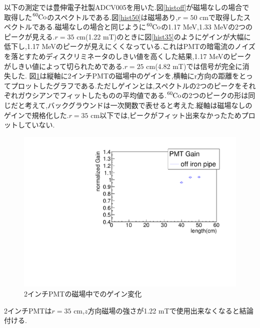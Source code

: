 以下の測定では豊伸電子社製ADC\hspace{3pt}V005を用いた.図\ref{histoff}が磁場なしの場合で取得した$\ce{^{60}Co}$のスペクトルである.図\ref{hist50}は磁場あり,$r=50$ cmで取得したスペクトルである.磁場なしの場合と同じように$\ce{^{60}Co}$の1.17 MeV,1.33 MeVの2つのピークが見える.$r=35$ cm(1.22 mT)のときに図\ref{hist35}のようにゲインが大幅に低下し,1.17 MeVのピークが見えにくくなっている.これはPMTの暗電流のノイズを落とすためディスクリミネータのしきい値を高くした結果,1.17 MeVのピークがしきい値によって切られためである.$r=25$ cm(4.82 mT)では信号が完全に消失した.
図\ref{plot2inchoff}は縦軸に2インチPMTの磁場中のゲインを,横軸にr方向の距離をとってプロットしたグラフである.ただしゲインとは,スペクトルの2つのピークをそれぞれガウシアンでフィットしたものの平均値である.$\ce{^{60}Co}$の2つのピークの形は同じだと考えて,バックグラウンドは一次関数で表せると考えた.縦軸は磁場なしのゲインで規格化した.$r=35$ cm以下では,ピークがフィット出来なかったためプロットしていない.

\begin{figure}[tbp]
	\centering
		\includegraphics[angle=-90,width=15cm]{fig/iguchi/plot2inchPMT.pdf}
	\caption{2インチPMTの磁場中でのゲイン変化}
	\label{plot2inchoff}
\end{figure}
2インチPMTは$r=35$ cm,$z$方向磁場の強さが1.22 mTで使用出来なくなると結論付ける.

